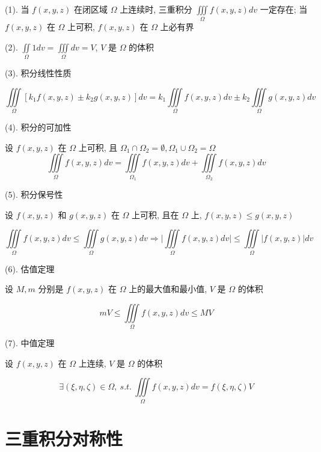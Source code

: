 \begin{corollary}

	(1). 当 $f(x,y,z)$ 在闭区域 $\Omega$ 上连续时, 三重积分 $\iiint\limits_{\Omega}f(x,y,z)dv$ 一定存在; 当 $f(x,y,z)$ 在 $\Omega$ 上可积, $f(x,y,z)$ 在 $\Omega$ 上必有界

	(2). $\iint\limits_{\Omega}1dv = \iiint\limits_{\Omega}dv = V$, $V$ 是 $\Omega$ 的体积

	(3). 积分线性性质

	$$\iiint\limits_{\Omega}\left[k_{1}f(x,y,z)\pm k_{2}g(x,y,z)\right] dv=k_{1}\iiint\limits_{\Omega}f(x,y,z)dv \pm k_{2}\iiint\limits_{\Omega}g(x,y,z)dv$$
	
	(4). 积分的可加性

	设 $f(x,y,z)$ 在 $\Omega$ 上可积, 且 $\Omega_{1} \cap \Omega_{2} = \emptyset, \Omega_{1} \cup \Omega_{2} =\Omega$
	$$\iiint\limits_{\Omega}f(x,y,z)dv = \iiint\limits_{\Omega_{1}}f(x,y,z)dv + \iiint\limits_{\Omega_{2}}f(x,y,z)dv $$

	(5). 积分保号性

	设 $f(x,y,z)$ 和 $g(x,y,z)$ 在 $\Omega$ 上可积, 且在 $\Omega$ 上, $f(x,y,z)\leq g(x,y,z)$

	$$\iiint\limits_{\Omega}f(x,y,z)dv \leq \iiint\limits_{\Omega}g(x,y,z)dv \Rightarrow \big|\iiint\limits_{\Omega}f(x,y,z)dv\big| \leq \iiint\limits_{\Omega}\big|f(x,y,z)\big|dv$$

	(6). 估值定理

	设 $M,m$ 分别是 $f(x,y,z)$ 在 $\Omega$ 上的最大值和最小值, $V$ 是 $\Omega$ 的体积
	
	$$mV \leq \iiint\limits_{\Omega}f(x,y,z)dv \leq MV$$

	(7). 中值定理

	设 $f(x,y,z)$ 在 $\Omega$ 上连续, $V$ 是 $\Omega$ 的体积

	$$\exists (\xi,\eta,\zeta) \in \Omega,\ s.t.\ \iiint\limits_{\Omega}f(x,y,z)dv = f(\xi,\eta,\zeta)V $$

\end{corollary}

\section{三重积分对称性}

